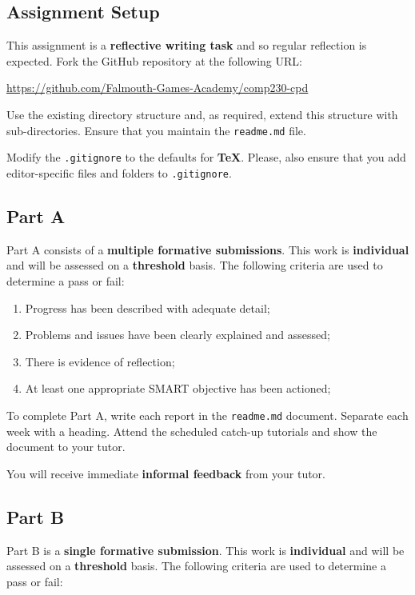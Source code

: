 \documentclass{../../fal_assignment}
\begin{document}
\subsection*{Assignment Setup}

This assignment is a \textbf{reflective writing task} and so regular reflection is expected. Fork the GitHub repository at the following URL:

\indent \url{https://github.com/Falmouth-Games-Academy/comp230-cpd}

Use the existing directory structure and, as required, extend this structure with sub-directories. Ensure that you maintain the \texttt{readme.md} file. 

Modify the \texttt{.gitignore} to the defaults for \textbf{TeX}. Please, also ensure that you add editor-specific files and folders to \texttt{.gitignore}. 

\subsection*{Part A}

Part A consists of a \textbf{multiple formative submissions}. This work is \textbf{individual} and will be assessed on a \textbf{threshold} basis. The following criteria are used to determine a pass or fail:

\begin{enumerate}[label=(\alph*)]
	\item Progress has been described with adequate detail;
	\item Problems and issues have been clearly explained and assessed;
	\item There is evidence of reflection;
	\item At least one appropriate SMART objective has been actioned;
\end{enumerate}

To complete Part A, write each report in the \texttt{readme.md} document. Separate each week with a heading. Attend the scheduled catch-up tutorials and show the document to your tutor. 

You will receive immediate \textbf{informal feedback} from your tutor.

\subsection*{Part B}

Part B is a \textbf{single formative submission}. This work is \textbf{individual} and will be assessed on a \textbf{threshold} basis. The following criteria are used to determine a pass or fail:
\end{document}
